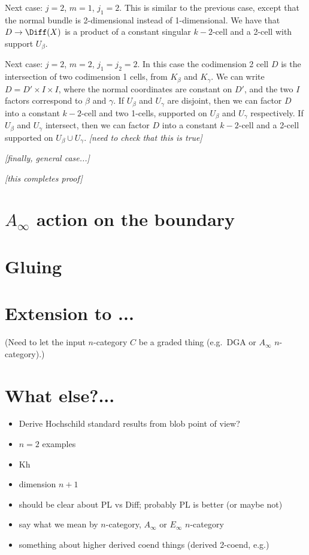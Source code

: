 \documentclass[11pt,leqno]{article}
\def\nn#1{{{\it \small [#1]}}}
\begin{document}
Next case: $j=2$, $m=1$, $j_1 = 2$.
This is similar to the previous case, except that the normal bundle is 2-dimensional instead of 
1-dimensional.
We have that $D \to \Diff(X)$ is a product of a constant singular $k{-}2$-cell
and a 2-cell with support $U_\beta$.

Next case: $j=2$, $m=2$, $j_1 = j_2 = 2$.
In this case the codimension 2 cell $D$ is the intersection of two
codimension 1 cells, from $K_\beta$ and $K_\gamma$.
We can write $D = D' \times I \times I$, where the normal coordinates are constant
on $D'$, and the two $I$ factors correspond to $\beta$ and $\gamma$.
If $U_\beta$ and $U_\gamma$ are disjoint, then we can factor $D$ into a constant $k{-}2$-cell and
two 1-cells, supported on $U_\beta$ and $U_\gamma$ respectively.
If $U_\beta$ and $U_\gamma$ intersect, then we can factor $D$ into a constant $k{-}2$-cell and
a 2-cell supported on $U_\beta \cup U_\gamma$.
\nn{need to check that this is true}

\nn{finally, general case...}

\nn{this completes proof}




\section{$A_\infty$ action on the boundary}


\section{Gluing}  \label{gluesect}

\section{Extension to ...}

(Need to let the input $n$-category $C$ be a graded thing 
(e.g.~DGA or $A_\infty$ $n$-category).)


\section{What else?...}

\begin{itemize}
\item Derive Hochschild standard results from blob point of view?
\item $n=2$ examples
\item Kh
\item dimension $n+1$
\item should be clear about PL vs Diff; probably PL is better
(or maybe not)
\item say what we mean by $n$-category, $A_\infty$ or $E_\infty$ $n$-category
\item something about higher derived coend things (derived 2-coend, e.g.)
\end{itemize}
\end{document}
